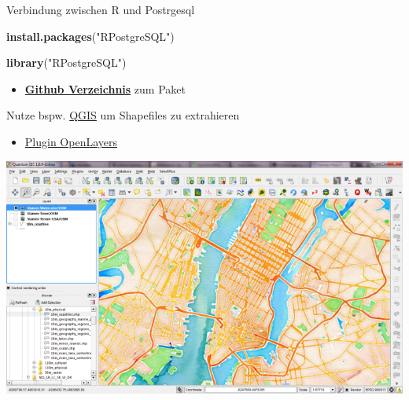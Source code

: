 \documentclass[ignorenonframetext,]{beamer}
\newenvironment{Shaded}{\begin{snugshade}}{\end{snugshade}}
\newcommand{\KeywordTok}[1]{\textcolor[rgb]{0.26,0.66,0.93}{\textbf{#1}}}
\newcommand{\NormalTok}[1]{\textcolor[rgb]{0.74,0.68,0.62}{#1}}
\newcommand{\StringTok}[1]{\textcolor[rgb]{0.02,0.61,0.04}{#1}}
\providecommand{\tightlist}{%
  \setlength{\itemsep}{0pt}\setlength{\parskip}{0pt}}
\begin{document}
\begin{frame}[fragile]{Verbindung zwischen R und Postrgesql}
\protect\hypertarget{verbindung-zwischen-r-und-postrgesql}{}

\begin{Shaded}
\begin{Highlighting}[]
\KeywordTok{install.packages}\NormalTok{(}\StringTok{"RPostgreSQL"}\NormalTok{)}
\end{Highlighting}
\end{Shaded}

\begin{Shaded}
\begin{Highlighting}[]
\KeywordTok{library}\NormalTok{(}\StringTok{"RPostgreSQL"}\NormalTok{)}
\end{Highlighting}
\end{Shaded}

\begin{itemize}
\tightlist
\item
  \href{https://github.com/tomoakin/RPostgreSQL}{\textbf{Github
  Verzeichnis}} zum Paket
\end{itemize}

\end{frame}

\begin{frame}{Nutze bspw. \href{http://www.qgis.org/de/site/}{QGIS} um
Shapefiles zu extrahieren}
\protect\hypertarget{nutze-bspw.-qgis-um-shapefiles-zu-extrahieren}{}

\begin{itemize}
\tightlist
\item
  \href{http://www.qgistutorials.com/de/docs/downloading_osm_data.html}{Plugin
  OpenLayers}
\end{itemize}

\includegraphics{figure/stamen_watercolor1.png}

\end{frame}
\end{document}
